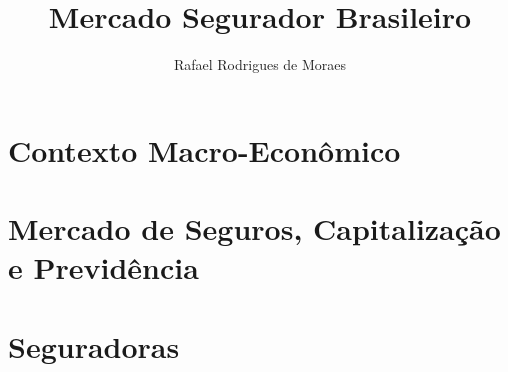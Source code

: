 \documentclass[a4paper,12pt]{article}
\begin{document}
\title{Mercado Segurador Brasileiro}
\author{Rafael Rodrigues de Moraes}
\maketitle

\pagebreak

\part{Contexto Macro-Econômico}
  
    
    
    
    
    
    
    
    
    

\part{Mercado de Seguros, Capitalização e Previdência}
  
    
    
    
    
    

\pagebreak
\part{Seguradoras}
\pagebreak
\end{document}
